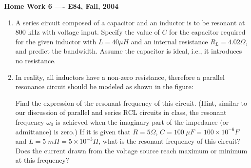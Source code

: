 \usepackage{html}

\begin{center}
{\Large \bf  Home Work 6 ---- E84, Fall, 2004}
\end{center}
\begin{enumerate}

\item A series circuit composed of a capacitor and an inductor is to be 
resonant at 800 kHz with voltage input. Specify the value of $C$ for the 
capacitor required for the given inductor with $L=40\mu H$ and an internal 
resistance $R_L=4.02\Omega$, and predict the bandwidth. Assume the capacitor 
is ideal, i.e., it introduces no resistance.



\item In reality, all inductors have a non-zero resistance, therefore a 
parallel resonance circuit should be modeled as shown in the figure:


Find the expression of the resonant frequency of this circuit. (Hint,
similar to our discussion of parallel and series RCL circuits in class, 
the resonant frequency $\omega_0$ is achieved when the imaginary part of
the impedance (or admittance) is zero.) If it is given that $R=5\Omega$,
$C=100\;\mu F=100\times 10^{-6}F$ and $L=5\; mH=5\times 10^{-3}H$, what
is the resonant frequency of this circuit? Does the current drawn from 
the voltage source reach maximum or minimum at this frequency?

% 


\end{enumerate}
